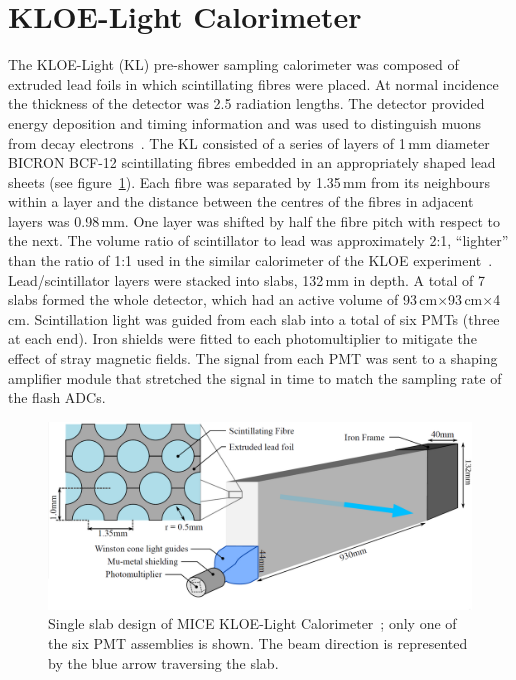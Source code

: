 \graphicspath{ {04-KL/Figures/} }

\section{KLOE-Light Calorimeter}
\label{Sect:KL}

The KLOE-Light (KL) pre-shower sampling calorimeter was composed of
extruded lead foils in which scintillating fibres were placed.
At normal incidence the thickness of the detector was 2.5 radiation
lengths.
The detector provided energy deposition and timing information and was
used to distinguish muons from decay
electrons~\cite{2016JInst..11P3001A}.
The KL consisted of a series of layers of 1\,mm diameter BICRON BCF-12
scintillating fibres embedded in an appropriately shaped lead sheets
(see figure~\ref{fig:KL2}).
Each fibre was separated by 1.35\,mm from its neighbours within a
layer and the distance between the centres of the fibres in adjacent
layers was 0.98\,mm.
One layer was shifted by half the fibre pitch with respect to the next.
The volume ratio of scintillator to lead was approximately 2:1,
``lighter'' than the ratio of 1:1 used in the similar calorimeter of the KLOE
experiment~\cite{Ambrosino:2009zza}. 
Lead/scintillator layers were stacked into slabs, 132\,mm in depth.
A total of 7 slabs formed the whole detector, which had an active
volume of 93\,cm$\times$93\,cm$\times$4\,cm.
Scintillation light was guided from each slab into a total of six PMTs
(three at each end).
Iron shields were fitted to each photomultiplier to mitigate the effect of stray magnetic fields.
The signal from each PMT was sent to a shaping amplifier module
that stretched the signal in time to match the sampling rate
of the flash ADCs. \\
\begin{figure}
  \begin{center}
    \includegraphics[width=0.8\columnwidth]{./04-KL/Figures/KL2_with_beam.png}
    \caption{Single slab design of MICE KLOE-Light Calorimeter~\cite{Overton:2014tka}; only one of the six PMT assemblies is shown.
    The beam direction is represented by the blue arrow traversing the slab.
    }
    \label{fig:KL2}
  \end{center}
\end{figure}

